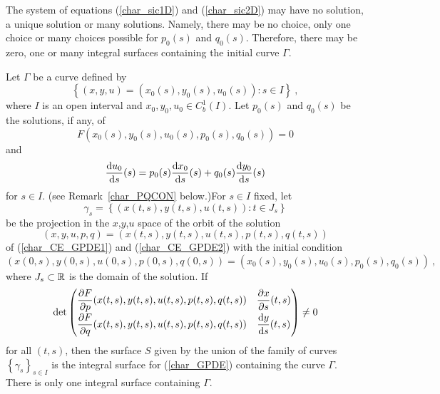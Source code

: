 \begin{rmk}
The system of equations (\ref{char_sic1D}) and (\ref{char_sic2D}) may
have no solution, a unique solution or many solutions.  Namely,
there may be no choice, only one choice or many choices possible for
$p_0(s)$ and $q_0(s)$.  Therefore, there may be zero, one or many
integral surfaces containing the initial curve $\Gamma$.
\end{rmk}

\begin{theorem}
Let $\Gamma$ be a curve defined by
\[
\left\{ (x,y,u) = \left(x_0(s), y_0(s),u_0(s)\right) : s\in I \right\} \ ,
\]
where $I$ is an open interval and $x_0, y_0, u_0 \in C_b^1(I)$.
Let $p_0(s)$ and $q_0(s)$ be the solutions, if any, of
\begin{equation} \label{char_idxIN1}
F\left( x_0(s), y_0(s), u_0(s), p_0(s), q_0(s)\right) = 0
\end{equation}
and
\begin{equation} \label{char_idxIN2}
\frac{\mathrm{d}u_0}{\mathrm{d}{s}}(s) = p_0(s)\frac{\mathrm{d}x_0}{\mathrm{d}{s}}(s)+ q_0(s)\frac{\mathrm{d}y_0}{\mathrm{d}{s}}(s)
\end{equation}
for $s\in I$.  (see Remark~\ref{char_PQCON} below.)\quad For $s \in I$
fixed, let
\[
\gamma_s = \left\{ \left(x(t,s), y(t,s), u(t,s) \right) : t \in J_s \right\}
\]
be the projection in the $x$,$y$,$u$ space of the orbit of the solution
\[
(x,y,u,p,q) = \left(x(t,s), y(t,s), u(t,s), p(t,s), q(t,s) \right)
\]
of (\ref{char_CE_GPDE1}) and (\ref{char_CE_GPDE2}) with the initial
condition
\begin{equation} \label{char_init_GPDE}
(x(0,s),y(0,s),u(0,s),p(0,s),q(0,s))
= \left(x_0(s), y_0(s), u_0(s), p_0(s), q_0(s) \right) \ ,
\end{equation}
where $J_s \subset \mathbb{R}$ is the domain of the solution.  If
\begin{equation} \label{char_GPDE_cond}
\det
\begin{pmatrix}
\displaystyle \frac{\partial{F}}{\partial p}(x(t,s),y(t,s),u(t,s),p(t,s),q(t,s)) &
\displaystyle \frac{\partial{x}}{\partial s}(t,s) \\[0.7em]
\displaystyle \frac{\partial{F}}{\partial q}(x(t,s),y(t,s),u(t,s),p(t,s),q(t,s)) &
\displaystyle \frac{\mathrm{d}y}{\mathrm{d}{s}}(t,s)
\end{pmatrix} \neq 0
\end{equation}
for all $(t,s)$, then the surface $S$ given by the union of the family
of curves $\displaystyle \left\{ \gamma_s \right\}_{s\in I}$ is the
integral surface for (\ref{char_GPDE}) containing the curve
$\Gamma$.  There is only one integral surface containing $\Gamma$.
\end{theorem}


